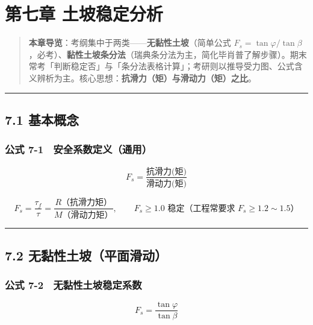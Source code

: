 \documentclass[
]{article}
\author{}
\date{}
\begin{document}
\section{第七章
土坡稳定分析}\label{ux7b2cux4e03ux7ae0-ux571fux5761ux7a33ux5b9aux5206ux6790}

\begin{quote}
\textbf{本章导览}：考纲集中于两类------\textbf{无黏性土坡}（简单公式
\(F_s=\tan\varphi/\tan\beta\)，必考）、\textbf{黏性土坡条分法}（瑞典条分法为主，简化毕肖普了解步骤）。期末常考「判断稳定否」与「条分法表格计算」；考研则以推导受力图、公式含义辨析为主。核心思想：\textbf{抗滑力（矩）与滑动力（矩）之比}。
\end{quote}

\begin{center}\rule{0.5\linewidth}{0.5pt}\end{center}

\subsection{7.1 基本概念}\label{ux57faux672cux6982ux5ff5}

\subsubsection{公式
7-1　安全系数定义（通用）}\label{ux516cux5f0f-7-1-ux5b89ux5168ux7cfbux6570ux5b9aux4e49ux901aux7528}

\[F_s=\frac{\text{抗滑力(矩)}}{\text{滑动力(矩)}}\]

\[F_s=\frac{\tau_{f}}{\tau}=\frac{R\text{（抗滑力矩）}}{M\text{（滑动力矩）}},\qquad F_s\ge1.0\text{ 稳定（工程常要求 }F_s\ge1.2\sim1.5\text{）}\]

\begin{center}\rule{0.5\linewidth}{0.5pt}\end{center}

\subsection{7.2
无黏性土坡（平面滑动）}\label{ux65e0ux9ecfux6027ux571fux5761ux5e73ux9762ux6ed1ux52a8}

\subsubsection{公式
7-2　无黏性土坡稳定系数}\label{ux516cux5f0f-7-2-ux65e0ux9ecfux6027ux571fux5761ux7a33ux5b9aux7cfbux6570}

\[\boxed{F_s=\frac{\tan\varphi}{\tan\beta}}\]
\end{document}
